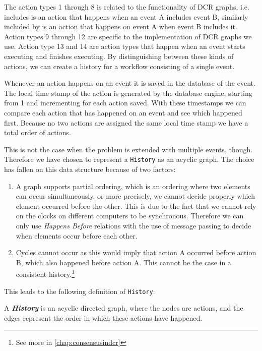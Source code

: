 	\newpar The action types 1 through 8 is related to the functionality of DCR graphs, i.e. includes is an action that happens when an event A includes event B, similarly included by is an action that happens on event A when event B includes it. Action types 9 through 12 are specific to the implementation of DCR graphs we use. Action type 13 and 14 are action types that happen when an event starts executing and finishes executing. By distinguishing between these kinds of actions, we can create a history for a workflow consisting of a single event. 
	
	\newpar Whenever an action happens on an event it is saved in the database of the event. The local time stamp of the action is generated by the database engine, starting from 1 and incrementing for each action saved. With these timestamps we can compare each action that has happened on an event and see which happened first. Because no two actions are assigned the same local time stamp we have a total order of actions.

	\newpar This is not the case when the problem is extended with multiple events, though. Therefore we have chosen to represent a \texttt{History} as an acyclic graph. The choice has fallen on this data structure because of two factors:
	
	\begin{enumerate}
		\item A graph supports partial ordering, which is an ordering where two elements can occur simultaneously, or more precisely, we cannot decide properly which element occurred before the other. This is due to the fact that we cannot rely on the clocks on different computers to be synchronous. Therefore we can only use \textit{Happens Before} relations with the use of message passing to decide when elements occur before each other.
	
		\item Cycles cannot occur as this would imply that action A occurred before action B, which also happened before action A. This cannot be the case in a consistent history.\footnote{See more in \autoref{chap:consensusindcr}}
	\end{enumerate}

	
	\newpar This leads to the following definition of \texttt{History}:
	
	\newpar
	\begin{definition}
		A \textit{\textbf{History}} is an acyclic directed graph, where the nodes are actions, and the edges represent the order in which these actions have happened.
	\end{definition}
	
